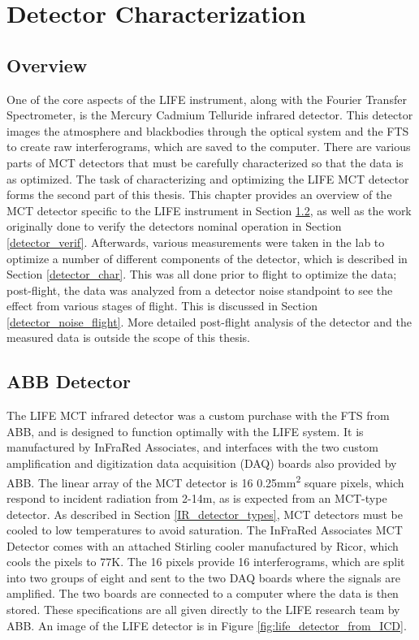 \chapter{Detector Characterization} \label{detector}

\section{Overview}
One of the core aspects of the LIFE instrument, along with the Fourier Transfer Spectrometer, is the Mercury Cadmium Telluride infrared detector. This detector images the atmosphere and blackbodies through the optical system and the FTS to create raw interferograms, which are saved to the computer. There are various parts of MCT detectors that must be carefully characterized so that the data is as optimized. The task of characterizing and optimizing the LIFE MCT detector forms the second part of this thesis. This chapter provides an overview of the MCT detector specific to the LIFE instrument in Section \ref{ABB_detector}, as well as the work originally done to verify the detectors nominal operation in Section \ref{detector_verif}. Afterwards, various measurements were taken in the lab to optimize a number of different components of the detector, which is described in Section \ref{detector_char}. This was all done prior to flight to optimize the data; post-flight, the data was analyzed from a detector noise standpoint to see the effect from various stages of flight. This is discussed in Section \ref{detector_noise_flight}. More detailed post-flight analysis of the detector and the measured data is outside the scope of this thesis.

\section{ABB Detector}\label{ABB_detector}
The LIFE MCT infrared detector was a custom purchase with the FTS from ABB, and is designed to function optimally with the LIFE system. It is manufactured by InFraRed Associates, and interfaces with the two custom amplification and digitization data acquisition (DAQ) boards also provided by ABB. The linear array of the MCT detector is 16 0.25mm\textsuperscript{2} square pixels, which respond to incident radiation from 2-14\textmu m, as is expected from an MCT-type detector. As described in Section \ref{IR_detector_types}, MCT detectors must be cooled to low temperatures to avoid saturation. The InFraRed Associates MCT Detector comes with an attached Stirling cooler manufactured by Ricor, which cools the pixels to 77K. The 16 pixels provide 16 interferograms, which are split into two groups of eight and sent to the two DAQ boards where the signals are amplified. The two boards are connected to a computer where the data is then stored. These specifications are all given directly to the LIFE research team by ABB. An image of the LIFE detector is in Figure \ref{fig:life_detector_from_ICD}.

